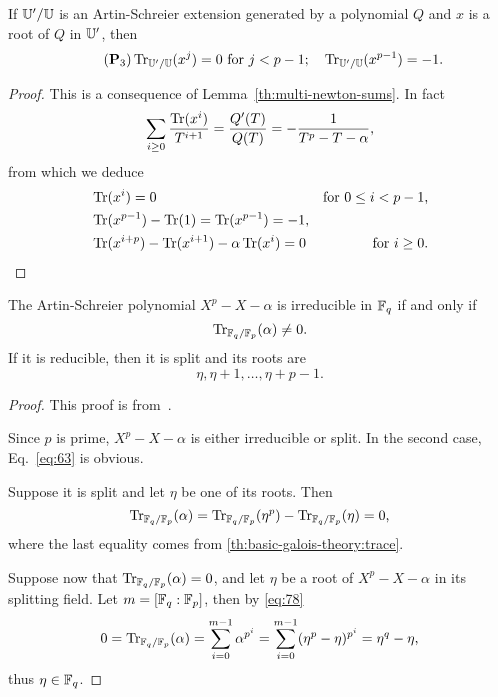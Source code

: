 \begin{proposition}
  \label{th:p3}
  If $\mathbb{U}'/\mathbb{U}$ is an Artin-Schreier extension generated by a polynomial
  $Q$ and $x$ is a root of $Q$ in $\mathbb{U}'$, then
\begin{equation}
  \tag{$\mathbf{P}_3$}\label{eq:pd} \Tr_{\U'/\U}(x^j) = 0~ \text{for}~j
  <p-1; \quad \Tr_{\U'/\U}(x^{p-1}) = -1\text{.}
\end{equation}
\end{proposition}
\begin{proof}
  This is a consequence of Lemma~\ref{th:multi-newton-sums}. In fact
  \begin{equation}
    \sum_{i\ge0} \frac{\operatorname{Tr}(x^{i})}{T^{i+1}} = \frac{Q'(T)}{Q(T)} =
    -\frac{1}{T^p-T-\alpha}
    \text{,}
  \end{equation}
  from which we deduce
  \begin{align}
    \label{eq:61}
    &\operatorname{Tr}(x^i) = 0 &\text{for $0\le i<p-1$,}\\
    &\operatorname{Tr}(x^{p-1}) - \operatorname{Tr}(1) = \operatorname{Tr}(x^{p-1}) = -1\text{,}\\
    &\operatorname{Tr}(x^{i+p}) - \operatorname{Tr}(x^{i+1}) - \alpha\operatorname{Tr}(x^{i}) = 0 &\text{for $i\ge 0$.}
  \end{align}
\end{proof}

\begin{proposition}
  \label{th:artin-schreier}
  The Artin-Schreier polynomial $X^p-X-\alpha$ is irreducible in $\mathbb{F}_q$
  if and only if
  \begin{equation}
    \label{eq:62}
    \operatorname{Tr}_{\mathbb{F}_q/\mathbb{F}_p}(\alpha) \ne 0
    \text{.}
  \end{equation}
  If it is reducible, then it is split and its roots are 
  \begin{equation}
    \label{eq:63}
    \eta, \eta+1, \ldots, \eta + p -1
    \text{.}
  \end{equation}
\end{proposition}
\begin{proof}
  This proof is from~\cite[Chapter~2]{lidl+niederreiter:2}.

  Since $p$ is prime, $X^p-X-\alpha$ is either irreducible or
  split. In the second case, Eq.~\eqref{eq:63} is obvious.

  Suppose it is split and let $\eta$ be one of its roots. Then
  \begin{equation}
    \operatorname{Tr}_{\mathbb{F}_q/\mathbb{F}_p}(\alpha) = \operatorname{Tr}_{\mathbb{F}_q/\mathbb{F}_p}(\eta^p) - \operatorname{Tr}_{\mathbb{F}_q/\mathbb{F}_p}(\eta) = 0
    \text{,}
  \end{equation}
  where the last equality comes from
  \ref{th:basic-galois-theory:trace}.

  Suppose now that $\operatorname{Tr}_{\mathbb{F}_q/\mathbb{F}_p}(\alpha)=0$, and let $\eta$ be a
  root of $X^p-X-\alpha$ in its splitting field. Let $m=[\mathbb{F}_q:\mathbb{F}_p]$,
  then by \eqref{eq:78}
  \begin{equation}
    0=\operatorname{Tr}_{\mathbb{F}_q/\mathbb{F}_p}(\alpha) = \sum_{i=0}^{m-1}\alpha^{p^i} =
    \sum_{i=0}^{m-1}(\eta^p-\eta)^{p^i} =\eta^{q}-\eta
    \text{,}
  \end{equation}
  thus $\eta\in\mathbb{F}_q$.
\end{proof}

